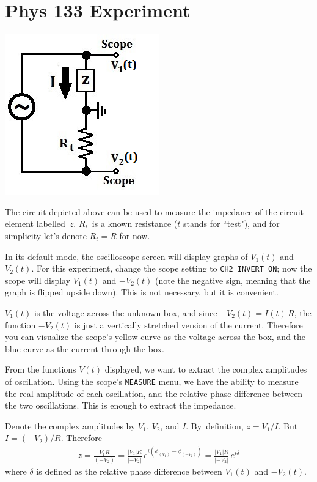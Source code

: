 \documentclass[11pt]{article}
\begin{document}
\clearpage
\section*{Phys 133 Experiment}
\begin{center}
\includegraphics[scale=.5]{images/testcircuit.png}
\end{center}

The circuit depicted above can be used to measure the impedance of the circuit element \mbox{labelled $z$}. \mbox{$R_t$ is} a known resistance ($t$ stands for ``test"), and for simplicity let's denote $R_t=R$ for now.

In its default mode, the oscilloscope screen will display graphs of $V_1(t)$ and $V_2(t)$. For this experiment, change the scope setting to \texttt{CH2 INVERT ON}; now the scope will display $V_1(t)$ and $-V_2(t)$ (note the negative sign, meaning that the graph is flipped upside down). This is not necessary, but it is convenient.

$V_1(t)$ is the voltage across the unknown box, and since $-V_2(t)=I(t)\, R$, the function $-V_2(t)$ is just a vertically stretched version of the current. Therefore you can visualize the scope's yellow curve as the voltage across the box, and the blue curve as the current through the box.

From the functions $V(t)$ displayed, we want to extract the complex amplitudes of oscillation. Using the scope's \texttt{MEASURE} menu, we have the ability to measure the real amplitude of each oscillation, and the relative phase difference between the two oscillations. This is enough to extract the impedance.

Denote the complex amplitudes by $V_1$, $V_2$, and $I$. \mbox{By definition}, $z= V_1/I$. But $I=(-V_2)/R$. Therefore
\begin{align*}
z = \frac{V_1 R}{(-V_2)} = \frac{|V_1| R}{|-V_2|} \, e^{i (\phi_{(V_1)} - \phi_{(-V_2)})} = \frac{|V_1| R}{|-V_2|} \, e^{i \delta } 
\end{align*}
where $\delta$ is defined as the relative phase difference between $V_1(t)$ and $-V_2(t)$. 
\end{document}
